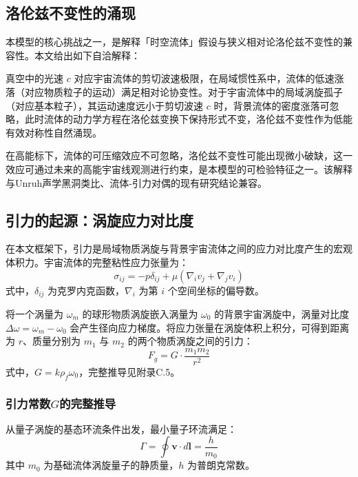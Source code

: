 \documentclass[aps,prd,preprint,superscriptaddress,floatfix,numbers,sort&compress]{revtex4-2}
\begin{document}
\subsection{洛伦兹不变性的涌现}
本模型的核心挑战之一，是解释「时空流体」假设与狭义相对论洛伦兹不变性的兼容性。本文给出如下自洽解释：

真空中的光速 $c$ 对应宇宙流体的剪切波速极限，在局域惯性系中，流体的低速涨落（对应物质粒子的运动）满足相对论协变性。对于宇宙流体中的局域涡旋孤子（对应基本粒子），其运动速度远小于剪切波速 $c$ 时，背景流体的密度涨落可忽略，此时流体的动力学方程在洛伦兹变换下保持形式不变，洛伦兹不变性作为低能有效对称性自然涌现。

在高能标下，流体的可压缩效应不可忽略，洛伦兹不变性可能出现微小破缺，这一效应可通过未来的高能宇宙线观测进行约束，是本模型的可检验特征之一。该解释与Unruh声学黑洞类比、流体-引力对偶的现有研究结论兼容\citep{barcelo2011analogue}。

\subsection{引力的起源：涡旋应力对比度}
在本文框架下，引力是局域物质涡旋与背景宇宙流体之间的应力对比度产生的宏观体积力。宇宙流体的完整粘性应力张量为：
\begin{equation}
\sigma_{ij}=-p\delta_{ij}+\mu \left( \nabla_{i}v_{j}+\nabla_{j}v_{i}\right)
\label{eq:stress_tensor}
\end{equation}
式中，$\delta_{ij}$ 为克罗内克函数，$\nabla_{i}$ 为第 $i$ 个空间坐标的偏导数。

将一个涡量为 $\omega_{m}$ 的球形物质涡旋嵌入涡量为 $\omega_{0}$ 的背景宇宙涡旋中，涡量对比度 $\Delta \omega=\omega_{m}-\omega_{0}$ 会产生径向应力梯度。将应力张量在涡旋体积上积分，可得到距离为 $r$、质量分别为 $m_{1}$ 与 $m_{2}$ 的两个物质涡旋之间的引力：
\begin{equation}
F_{g}=G \cdot \frac{m_{1} m_{2}}{r^{2}}
\label{eq:newton_gravity}
\end{equation}
式中，$G=k \rho_{f} \omega_{0}$，完整推导见附录C.5。

\subsubsection{引力常数$G$的完整推导}
从量子涡旋的基态环流条件出发，最小量子环流满足：
\begin{equation}
\Gamma=\oint \boldsymbol{v} \cdot d \boldsymbol{l}=\frac{h}{m_{0}}
\label{eq:circulation}
\end{equation}
其中 $m_{0}$ 为基础流体涡旋量子的静质量，$h$ 为普朗克常数。
\end{document}
